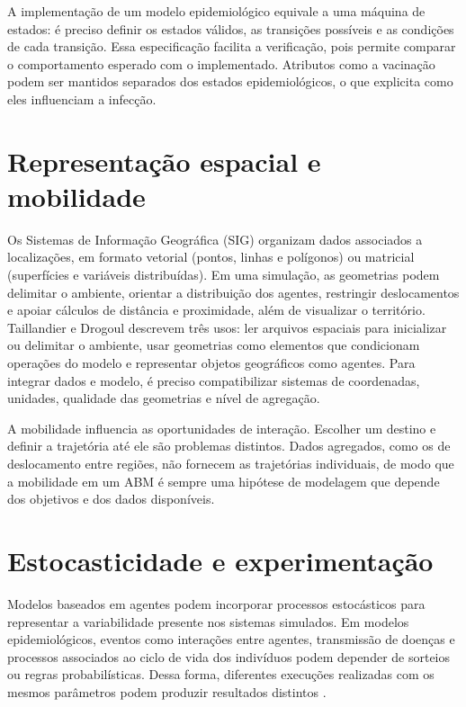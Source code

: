 A implementação de um modelo epidemiológico equivale a uma máquina de estados: é preciso definir os estados válidos, as transições possíveis e as condições de cada transição. Essa especificação facilita a verificação, pois permite comparar o comportamento esperado com o implementado. Atributos como a vacinação podem ser mantidos separados dos estados epidemiológicos, o que explicita como eles influenciam a infecção.

\section{Representação espacial e mobilidade}

Os Sistemas de Informação Geográfica (SIG) organizam dados associados a localizações, em formato vetorial (pontos, linhas e polígonos) ou matricial (superfícies e variáveis distribuídas). Em uma simulação, as geometrias podem delimitar o ambiente, orientar a distribuição dos agentes, restringir deslocamentos e apoiar cálculos de distância e proximidade, além de visualizar o território. Taillandier e Drogoul \cite{Taillandier2019} descrevem três usos: ler arquivos espaciais para inicializar ou delimitar o ambiente, usar geometrias como elementos que condicionam operações do modelo e representar objetos geográficos como agentes. Para integrar dados e modelo, é preciso compatibilizar sistemas de coordenadas, unidades, qualidade das geometrias e nível de agregação.

A mobilidade influencia as oportunidades de interação. Escolher um destino e definir a trajetória até ele são problemas distintos. Dados agregados, como os de deslocamento entre regiões, não fornecem as trajetórias individuais, de modo que a mobilidade em um ABM é sempre uma hipótese de modelagem que depende dos objetivos e dos dados disponíveis.

\section{Estocasticidade e experimentação}

Modelos baseados em agentes podem incorporar processos estocásticos para representar a variabilidade presente nos sistemas simulados. Em modelos epidemiológicos, eventos como interações entre agentes, transmissão de doenças e processos associados ao ciclo de vida dos indivíduos podem depender de sorteios ou regras probabilísticas. Dessa forma, diferentes execuções realizadas com os mesmos parâmetros podem produzir resultados distintos \cite{Macal2010,Taillandier2019,garcias_2024}.

